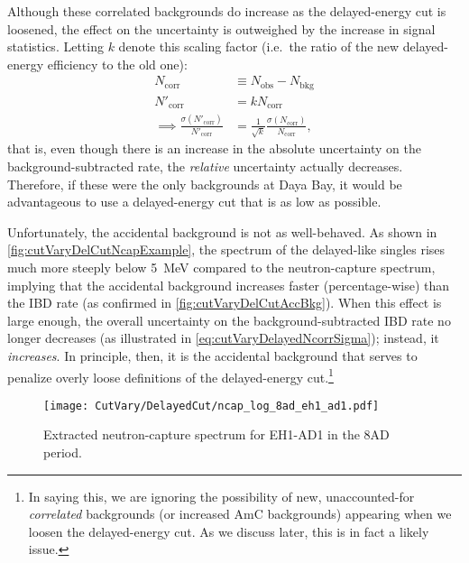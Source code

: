 \documentclass[../thesis.tex]{subfiles}
\begin{document}
Although these correlated backgrounds do increase as the delayed-energy cut is loosened, the effect on the uncertainty is outweighed by the increase in signal statistics. Letting $k$ denote this scaling factor (i.e.\ the ratio of the new delayed-energy efficiency to the old one):
\begin{align}
  \label{eq:cutVaryDelayedNcorrSigma}
  N_{\mathrm{corr}} &\equiv N_{\mathrm{obs}} - N_{\mathrm{bkg}} \\
  N'_{\mathrm{corr}} &= k N_{\mathrm{corr}} \\
  \implies \frac{\sigma(N'_{\mathrm{corr}})}{N'_{\mathrm{corr}}} &= \frac{1}{\sqrt{k}} \frac{\sigma(N_{\mathrm{corr}})}{N_{\mathrm{corr}}},
\end{align}
that is, even though there is an increase in the absolute uncertainty on the background-subtracted rate, the \emph{relative} uncertainty actually decreases. Therefore, if these were the only backgrounds at Daya Bay, it would be advantageous to use a delayed-energy cut that is as low as possible.

Unfortunately, the accidental background is not as well-behaved. As shown in \autoref{fig:cutVaryDelCutNcapExample}, the spectrum of the delayed-like singles rises much more steeply below 5~MeV compared to the neutron-capture spectrum, implying that the accidental background increases faster (percentage-wise) than the IBD rate (as confirmed in \autoref{fig:cutVaryDelCutAccBkg}). When this effect is large enough, the overall uncertainty on the background-subtracted IBD rate no longer decreases (as illustrated in \autoref{eq:cutVaryDelayedNcorrSigma}); instead, it \emph{increases}. In principle, then, it is the accidental background that serves to penalize overly loose definitions of the delayed-energy cut.\footnote{In saying this, we are ignoring the possibility of new, unaccounted-for \emph{correlated} backgrounds (or increased AmC backgrounds) appearing when we loosen the delayed-energy cut. As we discuss later, this is in fact a likely issue.}

\begin{figure}[ht]
  \texttt{[image: CutVary/DelayedCut/ncap\_log\_8ad\_eh1\_ad1.pdf]}
  \caption{Extracted neutron-capture spectrum for EH1-AD1 in the 8AD period.}
  \label{fig:cutVaryDelCutNcapExample}
\end{figure}

\end{document}
